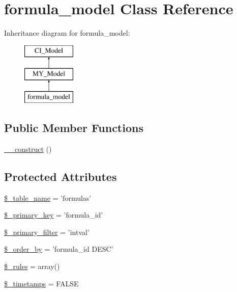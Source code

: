 \hypertarget{classformula__model}{\section{formula\-\_\-model Class Reference}
\label{classformula__model}
}
Inheritance diagram for formula\-\_\-model\-:\begin{figure}[H]
\begin{center}
\leavevmode
\includegraphics[height=3.000000cm]{classformula__model}
\end{center}
\end{figure}
\subsection*{Public Member Functions}
\begin{DoxyCompactItemize}
\item 
\hyperlink{classformula__model_a095c5d389db211932136b53f25f39685}{\-\_\-\-\_\-construct} ()
\end{DoxyCompactItemize}
\subsection*{Protected Attributes}
\begin{DoxyCompactItemize}
\item 
\hyperlink{classformula__model_a90ebc25e748e2696e00b5c5cf3255ee4}{\$\-\_\-table\-\_\-name} = 'formulas'
\item 
\hyperlink{classformula__model_a1befeb0c72587cd2574cd7d1818d66b8}{\$\-\_\-primary\-\_\-key} = 'formula\-\_\-id'
\item 
\hyperlink{classformula__model_a46d38cf0c97ee3e0a37dee799457bd14}{\$\-\_\-primary\-\_\-filter} = 'intval'
\item 
\hyperlink{classformula__model_a66602db6a52856d08dbd0f2eb34be787}{\$\-\_\-order\-\_\-by} = 'formula\-\_\-id D\-E\-S\-C'
\item 
\hyperlink{classformula__model_a2432b65e7e8b8a8328a1c47ab6ca0409}{\$\-\_\-rules} = array()
\item 
\hyperlink{classformula__model_a0af45edfd9d801cbc582a244700cd824}{\$\-\_\-timetamps} = F\-A\-L\-S\-E
\end{DoxyCompactItemize}



